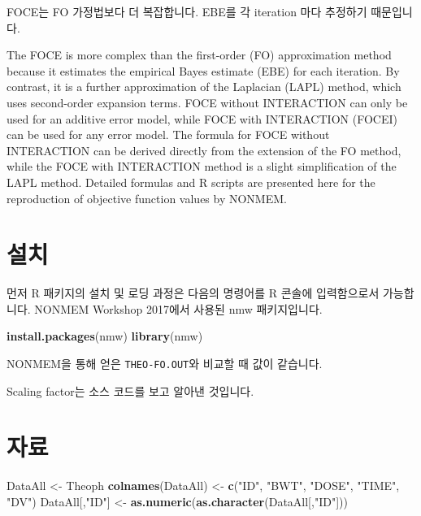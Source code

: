 \documentclass[
  12pt,
]{krantz}
\makeatletter
\newenvironment{Shaded}{\begin{snugshade}}{\end{snugshade}}
\newcommand{\KeywordTok}[1]{\textcolor[rgb]{0.13,0.29,0.53}{\textbf{#1}}}
\newcommand{\NormalTok}[1]{#1}
\newcommand{\StringTok}[1]{\textcolor[rgb]{0.31,0.60,0.02}{#1}}
\renewenvironment{quote}{\begin{VF}}{\end{VF}}
\newenvironment{kframe}{%
\medskip{}
\setlength{\fboxsep}{.8em}
 \def\at@end@of@kframe{}%
 \ifinner\ifhmode%
  \def\at@end@of@kframe{\end{minipage}}%
  \begin{minipage}{\columnwidth}%
 \fi\fi%
 \def\FrameCommand##1{\hskip\@totalleftmargin \hskip-\fboxsep
 \colorbox{shadecolor}{##1}\hskip-\fboxsep
     \hskip-\linewidth \hskip-\@totalleftmargin \hskip\columnwidth}%
 \MakeFramed {\advance\hsize-\width
   \@totalleftmargin\z@ \linewidth\hsize
   \@setminipage}}%
 {\par\unskip\endMakeFramed%
 \at@end@of@kframe}
\renewenvironment{Shaded}{\begin{kframe}}{\end{kframe}}
\makeatother
\begin{document}
FOCE는 FO 가정법보다 더 복잡합니다. EBE를 각 iteration 마다 추정하기 때문입니다.

\begin{quote}
The FOCE is more complex than the first-order (FO) approximation method because it estimates the empirical Bayes estimate (EBE) for each iteration. By contrast, it is a further approximation of the Laplacian (LAPL) method, which uses second-order expansion terms. FOCE without INTERACTION can only be used for an additive error model, while FOCE with INTERACTION (FOCEI) can be used for any error model. The formula for FOCE without INTERACTION can be derived directly from the extension of the FO method, while the FOCE with INTERACTION method is a slight simplification of the LAPL method. Detailed formulas and R scripts are presented here for the reproduction of objective function values by NONMEM.
\end{quote}

\hypertarget{uxc124uxce58}{%
\section{설치}\label{uxc124uxce58}}

먼저 R 패키지의 설치 및 로딩 과정은 다음의 명령어를 R 콘솔에 입력함으로서 가능합니다.
NONMEM Workshop 2017에서 사용된 nmw 패키지입니다. \citep{kim2015r, bae2016r, R-nmw}

\begin{Shaded}
\begin{Highlighting}[]
\KeywordTok{install.packages}\NormalTok{(}\StringTok{\textquotesingle{}nmw\textquotesingle{}}\NormalTok{)}
\KeywordTok{library}\NormalTok{(nmw)}
\end{Highlighting}
\end{Shaded}

NONMEM을 통해 얻은 \texttt{THEO-FO.OUT}와 비교할 때 값이 같습니다.

Scaling factor는 소스 코드를 보고 알아낸 것입니다.

\hypertarget{uxc790uxb8cc}{%
\section{자료}\label{uxc790uxb8cc}}

\begin{Shaded}
\begin{Highlighting}[]
\NormalTok{DataAll \textless{}{-}}\StringTok{ }\NormalTok{Theoph}
\KeywordTok{colnames}\NormalTok{(DataAll) \textless{}{-}}\StringTok{ }\KeywordTok{c}\NormalTok{(}\StringTok{"ID"}\NormalTok{, }\StringTok{"BWT"}\NormalTok{, }\StringTok{"DOSE"}\NormalTok{, }\StringTok{"TIME"}\NormalTok{, }\StringTok{"DV"}\NormalTok{)}
\NormalTok{DataAll[,}\StringTok{"ID"}\NormalTok{] \textless{}{-}}\StringTok{ }\KeywordTok{as.numeric}\NormalTok{(}\KeywordTok{as.character}\NormalTok{(DataAll[,}\StringTok{"ID"}\NormalTok{]))}
\end{Highlighting}
\end{Shaded}
\end{document}
